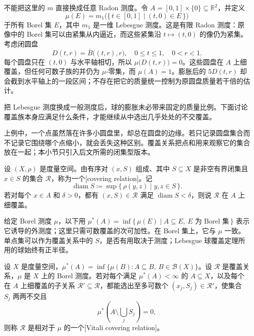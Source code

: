 \ProseParagraphBreak

不能把这里的 \(m\) 直接换成任意 Radon 测度。令 \(A=[0,1]\times\{0\}\subseteq\mathbb R^2\)，并定义
\[
\mu(E)=m_1\bigl(\{\,t\in[0,1]\mid(t,0)\in E\,\}\bigr)
\]
于所有 Borel 集 \(E\)，其中 \(m_1\) 是一维 Lebesgue 测度。这是有限 Radon 测度：原像中的 Borel 集可以由紧集从内逼近，而这些紧集沿 \(t\mapsto(t,0)\) 的像仍为紧集。考虑闭圆盘
\[
D(t,r)=\overline B\bigl((t,r),r\bigr),
\quad 0\leq t\leq1,\quad 0<r<1.
\]
每个圆盘只在 \((t,0)\) 与水平轴相切，所以 \(\mu\bigl(D(t,r)\bigr)=0\)。这些圆盘在 \(A\) 上细覆盖，但任何可数子族的并仍为 \(\mu\)-零集，而 \(\mu(A)=1\)。膨胀后的 \(5D(t,r)\) 却会截到水平轴上的一段区间；不存在把它的质量统一控制为原圆盘质量若干倍的估计。


把 Lebesgue 测度换成一般测度后，球的膨胀未必带来固定的质量比例。下面讨论覆盖族本身应满足什么条件，才能继续从中选出几乎处处的不交覆盖。

\ProseParagraphBreak

上例中，一个点虽然落在许多小圆盘里，却总在圆盘的边缘。若只记录圆盘集合而不记录它围绕哪个点缩小，就会丢失这种区别。覆盖关系把点和用来观察它的集合放在一起；本小节只引入后文所需的闭集型版本。

\begin{definition}
\label{b1:def:covering-relation}
设 \((X,\rho)\) 是度量空间。由有序对 \((x,S)\) 组成、其中 \(S\subseteq X\) 是非空有界闭集且 \(x\in S\) 的集合 \(\mathcal R\)，称为一个[covering relation]。记
\[
 \operatorname{diam}S
 \coloneqq\sup\{\,\rho(y,z)\mid y,z\in S\,\}.
\]
若对每个 \(x\in A\) 和 \(\delta>0\)，都有 \((x,S)\in\mathcal R\) 满足 \(\operatorname{diam}S<\delta\)，则说 \(\mathcal R\) 在 \(A\) 上细覆盖。
\end{definition}

给定 Borel 测度 \(\mu\)，以下用 \(\mu^*(A)=\inf\{\,\mu(E)\mid A\subseteq E,\ E\text{ 为 Borel 集}\,\}\) 表示它诱导的外测度；这里只需可数覆盖的次可加性。在 Borel 集上，它与 \(\mu\) 一致。单点集可以作为覆盖关系中的 \(S\)，是否有用取决于测度；Lebesgue 球覆盖定理所用的球始终有正半径。

\begin{definition}
\label{b1:def:vitali-relation}
设 \(X\) 是度量空间，\(\mu^*(A)=\inf\{\mu(B):A\subseteq B,\ B\in\mathcal B(X)\}\)。设 \(\mathcal R\) 是覆盖关系，\(\mu\) 是 \(X\) 上的 Borel 测度。若对每个满足 \(\mu^*(A)<\infty\) 的 \(A\subseteq X\)，以及每个在 \(A\) 上细覆盖的子关系 \(\mathcal R'\subseteq\mathcal R\)，都能选出至多可数个 \((x_j,S_j)\in\mathcal R'\)，使集合 \(S_j\) 两两不交且
\[
\mu^*\left(A\setminus\bigcup_jS_j\right)=0,
\]
则称 \(\mathcal R\) 是相对于 \(\mu\) 的一个[Vitali covering relation]。
\end{definition}

